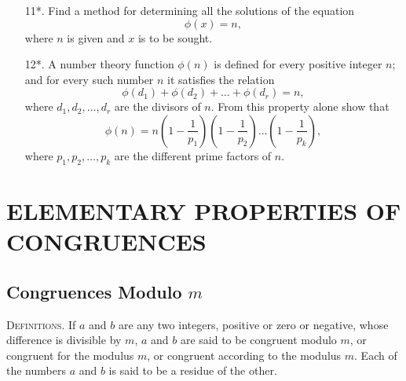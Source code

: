 \documentclass[oneside]{book}
\begin{document}
\begin{enumerate}
\item[11*.] Find a method for determining all the solutions of the
equation
\begin{equation*}
\phi(x) = n,
\end{equation*}
where $n$ is given and $x$ is to be sought.

\item[12*.] A number theory function $\phi(n)$ is defined for every
positive integer $n$; and for every such number $n$ it satisfies the
relation
\begin{equation*}
\phi(d_1) + \phi(d_2) + \ldots + \phi(d_r) = n,
\end{equation*}
where $d_1, d_2, \ldots, d_r$ are the divisors of $n$. From this
property alone show that
\begin{equation*}
\phi(n) = n \left ( 1 - \frac{1}{p_1} \right )
            \left ( 1 - \frac{1}{p_2} \right )
            \ldots
            \left ( 1 - \frac{1}{p_k} \right ),
\end{equation*}
where $p_1, p_2, \ldots, p_k$ are the different prime factors of
$n$. \end{enumerate} \normalsize{}

\chapter{ELEMENTARY PROPERTIES OF CONGRUENCES}%

\section{Congruences Modulo $m$}\label{s18}

\textsc{Definitions.} If $a$ and $b$ are any two integers, positive
or zero or negative, whose difference is divisible by $m$, $a$ and
$b$ are said to be congruent modulo $m$, or congruent for the
modulus $m$, or congruent according to the modulus $m$. Each of
the numbers $a$ and $b$ is said to be a residue of the other.%
\end{document}
